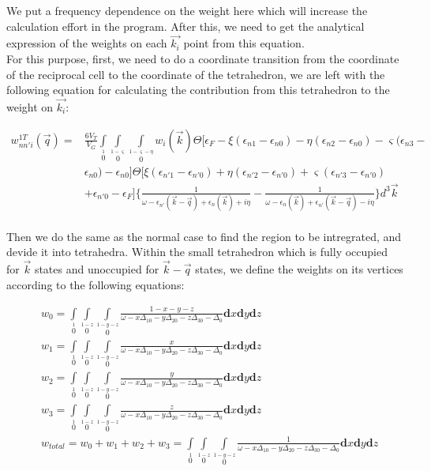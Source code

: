 \documentclass[10pt]{article}
\begin{document}
We put a frequency dependence on the weight here which will increase the calculation effort in the program. After this, we need to get the analytical expression of the weights on each $\vec{k_i}$ point from this equation.\\


For this purpose, first, we need to do a coordinate transition from the coordinate of the reciprocal cell to the coordinate of the tetrahedron, we are left with the following equation for calculating the contribution from this tetrahedron to the weight on $\vec{k_i}$:

\begin{eqnarray}\label{wtofkiT2}
{w_{nn'i}^{1T}}(\vec{q})=&\frac{6V_T}{V_G}
\int\limits_0\limits^1\int\limits_0\limits^{1-\varsigma}\int\limits_0\limits^{1-\varsigma-\eta}w_i(\vec{k})\Theta[\epsilon_F-\xi(\epsilon_{n1}-\epsilon_{n0})-\eta(\epsilon_{n2}-\epsilon_{n0})-\varsigma(\epsilon_{n3}-
\nonumber\\
&\epsilon_{n0})-\epsilon_{n0}]\Theta[\xi(\epsilon_{n'1}-\epsilon_{n'0})+\eta(\epsilon_{n'2}-\epsilon_{n'0})+\varsigma(\epsilon_{n'3}-\epsilon_{n'0})\nonumber\\&+\epsilon_{n'0}-\epsilon_F]\{\frac{1}{\omega-\epsilon_{n'}(\vec{k}-\vec{q})+\epsilon_{n}(\vec{k})+i\eta}-\frac{1}{\omega-\epsilon_{n}(\vec{k})+\epsilon_{n'}(\vec{k}-\vec{q})-i\eta}\}d^3\vec{k}	
\end{eqnarray}\\

Then we do the same as the normal case to find the region to be intregrated, and devide it into tetrahedra. Within the small tetrahedron which is fully occupied for $\vec{k}$ states and unoccupied for $\vec{k}-\vec{q}$ states, we define the weights on its vertices according to the following equations:

\begin{subequations}\label{wtdif}
\begin{align}
&{w}_{0}=\int\limits_0\limits^1\int\limits_0\limits^{1-z}\int\limits_0\limits^{1-y-z}\frac{1-x-y-z}{\omega-x\Delta_{10}-y\Delta_{20}-z\Delta_{30}-\Delta_{0}}\textbf{d}x\textbf{d}y\textbf{d}z\\
&{w}_{1}=\int\limits_0\limits^1\int\limits_0\limits^{1-z}\int\limits_0\limits^{1-y-z}\frac{x}{\omega-x\Delta_{10}-y\Delta_{20}-z\Delta_{30}-\Delta_{0}}\textbf{d}x\textbf{d}y\textbf{d}z\\
&{w}_{2}=\int\limits_0\limits^1\int\limits_0\limits^{1-z}\int\limits_0\limits^{1-y-z}\frac{y}{\omega-x\Delta_{10}-y\Delta_{20}-z\Delta_{30}-\Delta_{0}}\textbf{d}x\textbf{d}y\textbf{d}z\\
&{w}_{3}=\int\limits_0\limits^1\int\limits_0\limits^{1-z}\int\limits_0\limits^{1-y-z}\frac{z}{\omega-x\Delta_{10}-y\Delta_{20}-z\Delta_{30}-\Delta_{0}}\textbf{d}x\textbf{d}y\textbf{d}z\\
&{w}_{total}={w}_{0}+{w}_{1}+{w}_{2}+{w}_{3}=\int\limits_0\limits^1\int\limits_0\limits^{1-z}\int\limits_0\limits^{1-y-z}\frac{1}{\omega-x\Delta_{10}-y\Delta_{20}-z\Delta_{30}-\Delta_{0}}\textbf{d}x\textbf{d}y\textbf{d}z
\end{align}
\end{subequations}
\end{document}
